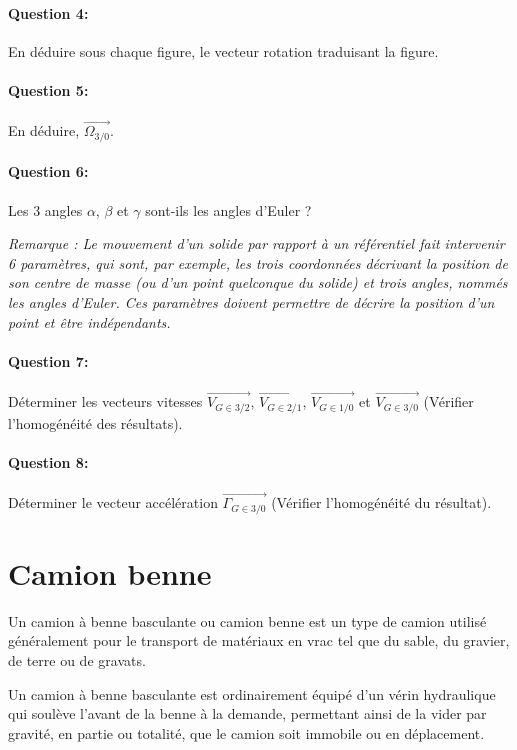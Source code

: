 \paragraph{Question 4:} En déduire sous chaque figure, le vecteur rotation traduisant la figure.

\paragraph{Question 5:} En déduire, $\overrightarrow{\Omega_{3/0}}$.

\paragraph{Question 6:} Les 3 angles $\alpha$, $\beta$ et $\gamma$ sont-ils les angles d'Euler ?

\textit{Remarque : Le mouvement d'un solide par rapport à un référentiel fait intervenir 6 paramètres, qui sont, par exemple, les trois coordonnées décrivant la position de son centre de masse (ou d'un point quelconque du solide) et trois angles, nommés les angles d'Euler. Ces paramètres doivent permettre de décrire la position d'un point et être indépendants.}


\paragraph{Question 7:} Déterminer les vecteurs vitesses $\overrightarrow{V_{G \in 3/2}}$, $\overrightarrow{V_{G \in 2/1}}$, $\overrightarrow{V_{G \in 1/0}}$ et $\overrightarrow{V_{G \in 3/0}}$ (Vérifier l'homogénéité des résultats).

\paragraph{Question 8:} Déterminer le vecteur accélération $\overrightarrow{\Gamma_{G \in 3/0}}$ (Vérifier l'homogénéité du résultat).

\newpage

\section{Camion benne}

Un camion à benne basculante ou camion benne est un type de camion utilisé généralement pour le transport de matériaux en vrac tel que du sable, du gravier, de terre ou de gravats.

Un camion à benne basculante est ordinairement équipé d'un vérin hydraulique qui soulève l'avant de la benne à la demande, permettant ainsi de la vider par gravité, en partie ou totalité, que le camion soit immobile ou en déplacement.

